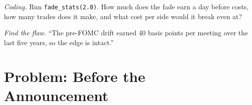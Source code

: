 \begin{exercise}[$\star\star\star$]\label{exo:s1:short-term-futures-strategies:7}
\emph{Coding.} Run \texttt{fade\_stats(2.0)}. How much does the fade earn a day before costs, how many trades does it make, and what cost per side
would it break even at?
\end{exercise}

\begin{exercise}[$\star\star\star$]\label{exo:s1:short-term-futures-strategies:8}
\emph{Find the flaw.} ``The pre-FOMC drift earned 40 basis points per meeting over the last five years, so the edge is intact.''
\end{exercise}

\section{Problem: Before the Announcement}

